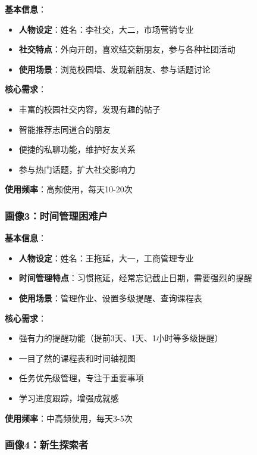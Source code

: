 \documentclass[12pt,a4paper]{article}
\begin{document}
\textbf{基本信息}：
\begin{itemize}
    \item \textbf{人物设定}：姓名：李社交，大二，市场营销专业
    \item \textbf{社交特点}：外向开朗，喜欢结交新朋友，参与各种社团活动
    \item \textbf{使用场景}：浏览校园墙、发现新朋友、参与话题讨论
\end{itemize}

\textbf{核心需求}：
\begin{itemize}
    \item 丰富的校园社交内容，发现有趣的帖子
    \item 智能推荐志同道合的朋友
    \item 便捷的私聊功能，维护好友关系
    \item 参与热门话题，扩大社交影响力
\end{itemize}

\textbf{使用频率}：高频使用，每天10-20次

\subsubsection{画像3：时间管理困难户}

\textbf{基本信息}：
\begin{itemize}
    \item \textbf{人物设定}：姓名：王拖延，大一，工商管理专业
    \item \textbf{时间管理特点}：习惯拖延，经常忘记截止日期，需要强烈的提醒
    \item \textbf{使用场景}：管理作业、设置多级提醒、查询课程表
\end{itemize}

\textbf{核心需求}：
\begin{itemize}
    \item 强有力的提醒功能（提前3天、1天、1小时等多级提醒）
    \item 一目了然的课程表和时间轴视图
    \item 任务优先级管理，专注于重要事项
    \item 学习进度跟踪，增强成就感
\end{itemize}

\textbf{使用频率}：中高频使用，每天3-5次

\subsubsection{画像4：新生探索者}
\end{document}
